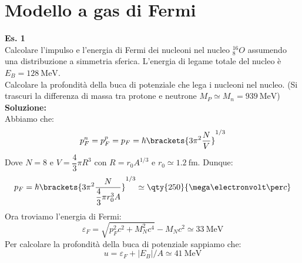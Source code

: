 \section{Modello a gas di Fermi}
\textbf{Es. 1}\\
Calcolare l'impulso e l'energia di Fermi dei nucleoni nel nucleo $^{16}_8O$ assumendo una distribuzione a simmetria sferica. L'energia di legame totale del nucleo è $E_B = \qty{128}{\mega\electronvolt}$.\\
Calcolare la profondità della buca di potenziale che lega i nucleoni nel nucleo. (Si trascuri la differenza di massa tra protone e neutrone $M_P \simeq M_n = \qty{939}{\mega\electronvolt}$)\\
\textbf{Soluzione:}\\
Abbiamo che:
\begin{equation}
 p^n_F = p^p_F = p_F = \hbar \brackets{3 \pi^2 \dfrac{N}{V}}^{1/3}
\end{equation}
Dove $N = 8$ e $V = \dfrac{4}{3} \pi R^3$ con $R = r_0 A^{1/3}$ e $r_0 \simeq \qty{1.2}{\femto\meter}$. Dunque:
\begin{equation}
 p_F = \hbar \brackets{3 \pi^2 \dfrac{N}{\dfrac{4}{3} \pi r_0^3 A}}^{1/3} \simeq \qty{250}{\mega\electronvolt\per c}
\end{equation}
Ora troviamo l'energia di Fermi:
\begin{equation}
 \varepsilon_F = \sqrt{p_F^2 c^2 + M_N^2 c^4} - M_N c^2 \simeq \qty{33}{\mega\electronvolt}
\end{equation}
Per calcolare la profondità della buca di potenziale sappiamo che:
\begin{equation}
  u = \varepsilon_F + |E_B|/A \simeq \qty{41}{\mega\electronvolt}
\end{equation}

